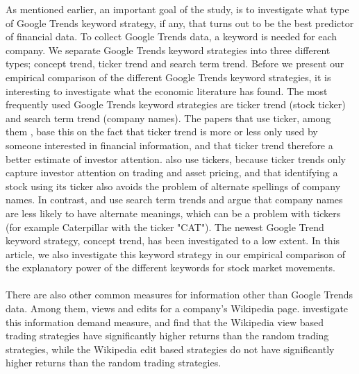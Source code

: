 As mentioned earlier, an important goal of the study, is to investigate what type of Google Trends keyword strategy, if any, that turns out to be the best predictor of financial data. To collect Google Trends data, a keyword is needed for each company. We separate Google Trends keyword strategies into three different types; concept trend, ticker trend and search term trend. Before we present our empirical comparison of the different Google Trends keyword strategies, it is interesting to investigate what the economic literature has found. The most frequently used Google Trends keyword strategies are ticker trend (stock ticker) and search term trend (company names). The papers that use ticker, among them \cite{joseph}, base this on the fact that ticker trend is more or less only used by someone interested in financial information, and that ticker trend therefore a better estimate of investor attention. \cite{engelberg} also use tickers, because ticker trends only capture investor attention on trading and asset pricing, and that identifying a stock using its ticker also avoids the problem of alternate spellings of company names. In contrast, \cite{bijl} and \cite{vlastakis} use search term trends and argue that company names are less likely to have alternate meanings, which can be a problem with tickers (for example Caterpillar with the ticker "CAT"). The newest Google Trend keyword strategy, concept trend, has been investigated to a low extent. In this article, we also investigate this keyword strategy in our empirical comparison of the explanatory power of the different keywords for stock market movements.     
\\\\
There are also other common measures for information other than Google Trends data. Among them, views and edits for a company's Wikipedia page. \cite{moat} investigate this information demand measure, and find that the Wikipedia view based trading strategies have significantly higher returns than the random trading strategies, while the Wikipedia edit based strategies do not have significantly higher returns than the random trading strategies. 
\\\\
